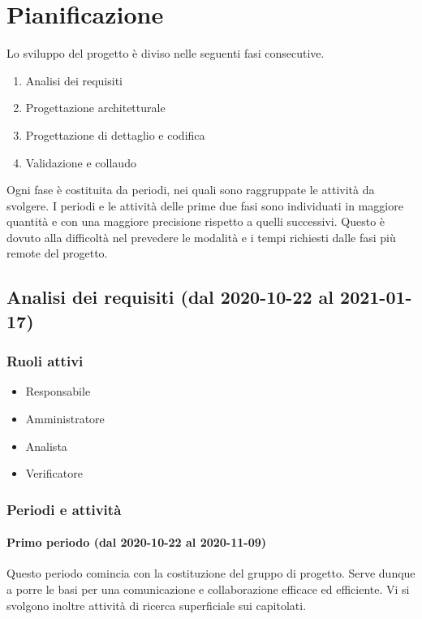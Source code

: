 \section{Pianificazione}
Lo sviluppo del progetto è diviso nelle seguenti fasi consecutive.
\begin{enumerate}
	\item Analisi dei requisiti
	\item Progettazione architetturale
	\item Progettazione di dettaglio e codifica
	\item Validazione e collaudo
\end{enumerate}
Ogni fase è costituita da periodi, nei quali sono raggruppate le attività da svolgere.
I periodi e le attività delle prime due fasi sono individuati in maggiore quantità e con una maggiore precisione rispetto a quelli successivi. Questo è dovuto alla difficoltà nel prevedere le modalità e i tempi richiesti dalle fasi più remote del progetto.

\subsection{Analisi dei requisiti (dal 2020-10-22 al 2021-01-17)}

\subsubsection{Ruoli attivi}
\begin{itemize}
	\item Responsabile
	\item Amministratore
	\item Analista
	\item Verificatore
\end{itemize}

\subsubsection{Periodi e attività}

\paragraph{Primo periodo (dal 2020-10-22 al 2020-11-09)}
Questo periodo comincia con la costituzione del gruppo di progetto. Serve dunque a porre le basi per una comunicazione e collaborazione efficace ed efficiente. Vi si svolgono inoltre attività di ricerca superficiale sui capitolati.

